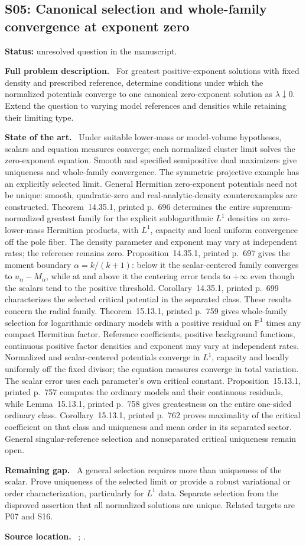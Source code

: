 \documentclass[11pt]{article}
\newcommand{\field}[1]{\par\medskip\noindent\textbf{#1.}\ }
\begin{document}
\subsection{S05: Canonical selection and whole-family convergence at exponent zero}
\label{S05}
\noindent\textbf{Status:} unresolved question in the manuscript.
\field{Full problem description} For greatest positive-exponent solutions with fixed density and prescribed reference, determine conditions under which the normalized potentials converge to one canonical zero-exponent solution as $\lambda\downarrow0$. Extend the question to varying model references and densities while retaining their limiting type.
\field{State of the art} Under suitable lower-mass or model-volume hypotheses, scalars and equation measures converge; each normalized cluster limit solves the zero-exponent equation. Smooth and specified semipositive dual maximizers give uniqueness and whole-family convergence. The symmetric projective example has an explicitly selected limit. General Hermitian zero-exponent potentials need not be unique: smooth, quadratic-zero and real-analytic-density counterexamples are constructed. Theorem~14.35.1, printed p.~696 determines the entire supremum-normalized greatest family for the explicit sublogarithmic $L^1$ densities on zero-lower-mass Hermitian products, with $L^1$, capacity and local uniform convergence off the pole fiber. The density parameter and exponent may vary at independent rates; the reference remains zero. Proposition~14.35.1, printed p.~697 gives the moment boundary $\alpha=k/(k+1)$: below it the scalar-centered family converges to $u_\alpha-M_\alpha$, while at and above it the centering error tends to $+\infty$ even though the scalars tend to the positive threshold. Corollary~14.35.1, printed p.~699 characterizes the selected critical potential in the separated class. These results concern the radial family. Theorem~15.13.1, printed p.~759 gives whole-family selection for logarithmic ordinary models with a positive residual on $\mathbb P^1$ times any compact Hermitian factor. Reference coefficients, positive background functions, continuous positive factor densities and exponent may vary at independent rates. Normalized and scalar-centered potentials converge in $L^1$, capacity and locally uniformly off the fixed divisor; the equation measures converge in total variation. The scalar error uses each parameter's own critical constant. Proposition~15.13.1, printed p.~757 computes the ordinary models and their continuous residuals, while Lemma~15.13.1, printed p.~758 gives greatestness on the entire one-sided ordinary class. Corollary~15.13.1, printed p.~762 proves maximality of the critical coefficient on that class and uniqueness and mean order in its separated sector. General singular-reference selection and nonseparated critical uniqueness remain open.
\field{Remaining gap} A general selection requires more than uniqueness of the scalar. Prove uniqueness of the selected limit or provide a robust variational or order characterization, particularly for $L^1$ data. Separate selection from the disproved assertion that all normalized solutions are unique. Related targets are P07 and S16.
\field{Source location} ; .
\end{document}
